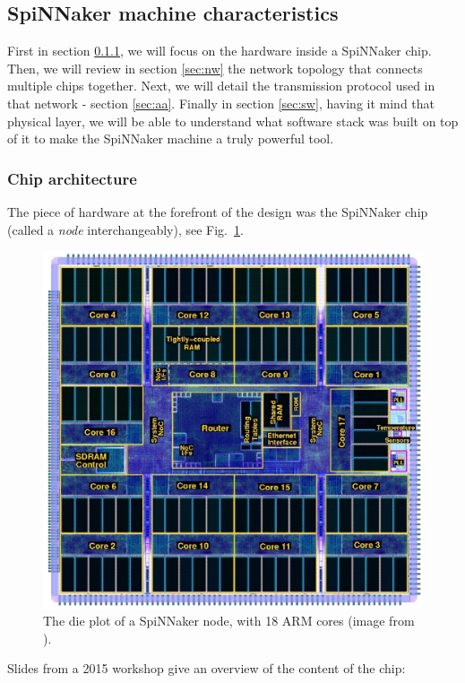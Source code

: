 \subsection{SpiNNaker machine characteristics} \label{sec:smc}

First in section \ref{sec:hw}, we will focus on the hardware inside a SpiNNaker chip. Then, we will review in section \ref{sec:nw} the network topology that connects multiple chips together. Next, we will detail the transmission protocol used in that network - section \ref{sec:aa}. Finally in section \ref{sec:sw}, having it mind that physical layer, we will be able to understand what software stack was built on top of it to make the SpiNNaker machine a truly powerful tool.

\subsubsection{Chip architecture} \label{sec:hw}

The piece of hardware at the forefront of the design was the SpiNNaker chip (called a \textit{node} interchangeably), see Fig.~\ref{fig:spinn-core-labeled}. 

\begin{figure}[hbtp]
\centering
\includegraphics[width = 0.8\hsize]{figures/spinn_labeled_bw.png} 
\caption{The die plot of a SpiNNaker node, with 18 ARM cores (image from \cite{spinn-core}).}
\label{fig:spinn-core-labeled}
\end{figure}

Slides from a 2015 workshop \cite{spin-chip-resources} give an overview of the content of the chip:

